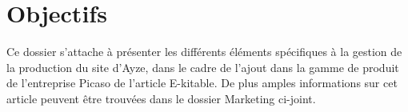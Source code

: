 \section{Objectifs}

Ce dossier s'attache à présenter les différents éléments spécifiques à la
gestion de la production du site d'Ayze, dans le cadre de l'ajout dans la
gamme de produit de l'entreprise Picaso de l'article E-kitable.
De plus amples informations sur cet article peuvent être trouvées dans
le dossier Marketing ci-joint.


